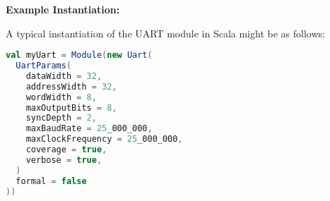 \textbf{Example Instantiation:}

A typical instantiation of the UART module in Scala might be as follows:

\begin{lstlisting}[language=Scala]
val myUart = Module(new Uart(
  UartParams(
    dataWidth = 32,
    addressWidth = 32,
    wordWidth = 8,
    maxOutputBits = 8,
    syncDepth = 2,
    maxBaudRate = 25_000_000,
    maxClockFrequency = 25_000_000,
    coverage = true,
    verbose = true,
  )
  formal = false
))
\end{lstlisting}